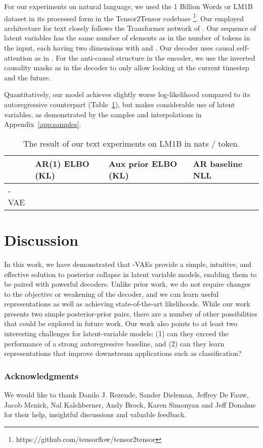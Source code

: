 \documentclass{article} \usepackage{iclr2019_conference,times}
\newcommand{\tblref}[1]{Table~\ref{#1}}
\newcommand{\aref}[1]{Appendix~\ref{#1}}
\begin{document}
For our experiments on natural language, we used the 1 Billion Words or LM1B \citep{lm1b} dataset in its processed form in the Tensor2Tensor \citep{tensor2tensor} codebase \footnote{https://github.com/tensorflow/tensor2tensor}. 
Our employed architecture for text closely follows the Transformer network of \cite{Vaswani2017}. Our sequence of latent variables has the same number of elements as in the number of tokens in the input, each having two dimensions with  and . Our decoder uses causal self-attention as in \cite{Vaswani2017}. For the anti-causal structure in the encoder, we use the inverted causality masks as in the decoder to only allow looking at the current timestep and the future. 
\par
Quantitatively, our model achieves slightly worse log-likelihood compared to its autoregressive counterpart (\tblref{tbl:lm1b}), but makes considerable use of latent variables, as demonstrated by the samples and interpolations in \aref{app:samples}.
\begin{table}[ht]
\centering
\begin{tabular}{@{}l|lll@{}}
    & AR(1) ELBO (KL)  & Aux prior ELBO (KL) &  AR baseline NLL  \\
\hline    
-VAE   &   &   &  \\
\bottomrule
\end{tabular}
\caption{The result of our text experiments on LM1B in nats / token.}
\label{tbl:lm1b}
\end{table}

 \section{Discussion}
In this work, we have demonstrated that -VAEs provide a simple, intuitive, and effective solution to posterior collapse in latent variable models, enabling them to be paired with powerful decoders. Unlike prior work, we do not require changes to the objective or weakening of the decoder, and we can learn useful representations as well as achieving state-of-the-art likelihoods. While our work presents two simple posterior-prior pairs, there are a number of other possibilities that could be explored in future work. Our work also points to at least two interesting challenges for latent-variable models: (1) can they exceed the performance of a strong autoregressive baseline, and (2) can they learn representations that improve downstream applications such as classification? 

\subsubsection*{Acknowledgments}
We would like to thank Danilo J. Rezende, 
Sander Dieleman, Jeffrey De Fauw,
Jacob Menick, Nal Kalchberner, Andy Brock, Karen Simonyan and Jeff Donahue for their help, insightful discussions and valuable feedback.
\end{document}
